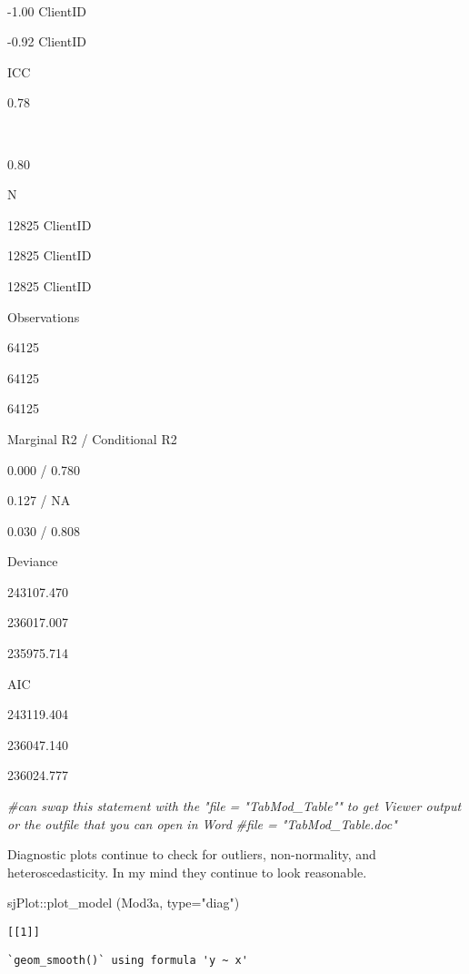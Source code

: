 \documentclass[
  11pt,
]{book}
\newenvironment{Shaded}{\begin{snugshade}}{\end{snugshade}}
\newcommand{\AttributeTok}[1]{\textcolor[rgb]{0.77,0.63,0.00}{#1}}
\newcommand{\CommentTok}[1]{\textcolor[rgb]{0.56,0.35,0.01}{\textit{#1}}}
\newcommand{\FunctionTok}[1]{\textcolor[rgb]{0.00,0.00,0.00}{#1}}
\newcommand{\NormalTok}[1]{#1}
\newcommand{\SpecialCharTok}[1]{\textcolor[rgb]{0.00,0.00,0.00}{#1}}
\newcommand{\StringTok}[1]{\textcolor[rgb]{0.31,0.60,0.02}{#1}}
\begin{document}
~

-1.00 ClientID

-0.92 ClientID

ICC

0.78

~

0.80

N

12825 ClientID

12825 ClientID

12825 ClientID

Observations

64125

64125

64125

Marginal R2 / Conditional R2

0.000 / 0.780

0.127 / NA

0.030 / 0.808

Deviance

243107.470

236017.007

235975.714

AIC

243119.404

236047.140

236024.777

\begin{Shaded}
\begin{Highlighting}[]
\CommentTok{\#can swap this statement with the "file = "TabMod\_Table"" to get Viewer output or the outfile that you can open in Word}
\CommentTok{\#file = "TabMod\_Table.doc"}
\end{Highlighting}
\end{Shaded}

Diagnostic plots continue to check for outliers, non-normality, and heteroscedasticity. In my mind they continue to look reasonable.

\begin{Shaded}
\begin{Highlighting}[]
\NormalTok{sjPlot}\SpecialCharTok{::}\FunctionTok{plot\_model}\NormalTok{ (Mod3a, }\AttributeTok{type=}\StringTok{"diag"}\NormalTok{)}
\end{Highlighting}
\end{Shaded}

\begin{verbatim}
[[1]]
\end{verbatim}

\begin{verbatim}
`geom_smooth()` using formula 'y ~ x'
\end{verbatim}
\end{document}
